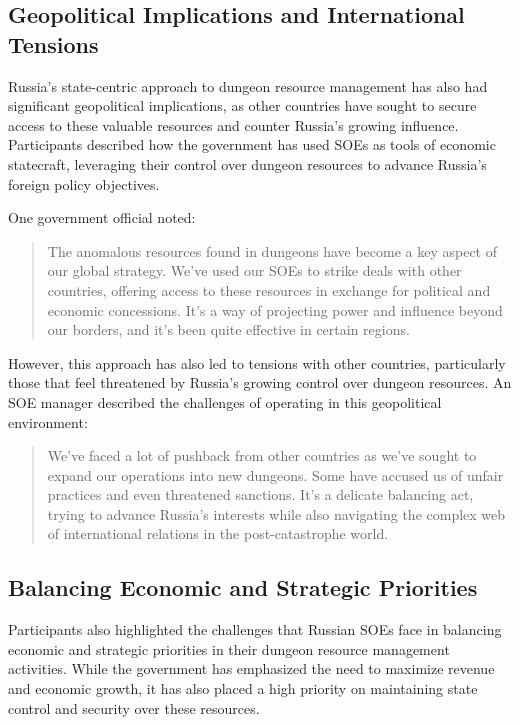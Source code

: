 \documentclass[12pt, a4paper]{article}
\begin{document}
\subsection{Geopolitical Implications and International Tensions}
Russia's state-centric approach to dungeon resource management has also had significant geopolitical implications, as other countries have sought to secure access to these valuable resources and counter Russia's growing influence. Participants described how the government has used SOEs as tools of economic statecraft, leveraging their control over dungeon resources to advance Russia's foreign policy objectives.

One government official noted:

\begin{quote}
The anomalous resources found in dungeons have become a key aspect of our global strategy. We've used our SOEs to strike deals with other countries, offering access to these resources in exchange for political and economic concessions. It's a way of projecting power and influence beyond our borders, and it's been quite effective in certain regions.
\end{quote}

However, this approach has also led to tensions with other countries, particularly those that feel threatened by Russia's growing control over dungeon resources. An SOE manager described the challenges of operating in this geopolitical environment:

\begin{quote}
We've faced a lot of pushback from other countries as we've sought to expand our operations into new dungeons. Some have accused us of unfair practices and even threatened sanctions. It's a delicate balancing act, trying to advance Russia's interests while also navigating the complex web of international relations in the post-catastrophe world.
\end{quote}

\subsection{Balancing Economic and Strategic Priorities}
Participants also highlighted the challenges that Russian SOEs face in balancing economic and strategic priorities in their dungeon resource management activities. While the government has emphasized the need to maximize revenue and economic growth, it has also placed a high priority on maintaining state control and security over these resources.
\end{document}
